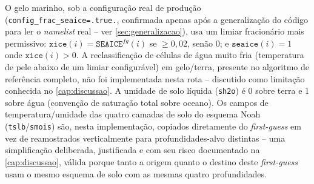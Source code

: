 O gelo marinho, sob a configuração real de produção
(\texttt{config\_frac\_seaice=.true.}, confirmada apenas após a
generalização do código para ler o \textit{namelist} real -- ver
\cref{sec:generalizacao}), usa um limiar fracionário mais permissivo:
$\texttt{xice}(i) = \texttt{SEAICE}^{fg}(i)$ se $\ge 0{,}02$, senão $0$;
e $\texttt{seaice}(i)=1$ onde $\texttt{xice}(i)>0$. A reclassificação de
células de água muito fria (temperatura de pele abaixo de um limiar
configurável) em gelo/terra, presente no algoritmo de referência
completo, não foi implementada nesta rota -- discutido como limitação
conhecida no \cref{cap:discussao}. A umidade de solo líquida
(\texttt{sh2o}) é $0$ sobre terra e $1$ sobre água (convenção de
saturação total sobre oceano). Os campos de temperatura/umidade das
quatro camadas de solo do esquema Noah (\texttt{tslb}/\texttt{smois})
são, nesta implementação, copiados diretamente do \textit{first-guess}
em vez de reamostrados verticalmente para profundidades-alvo distintas
-- uma simplificação deliberada, justificada e com seu risco documentado
na \cref{cap:discussao}, válida porque tanto a origem quanto o destino
deste \textit{first-guess} usam o mesmo esquema de solo com as mesmas
quatro profundidades.
